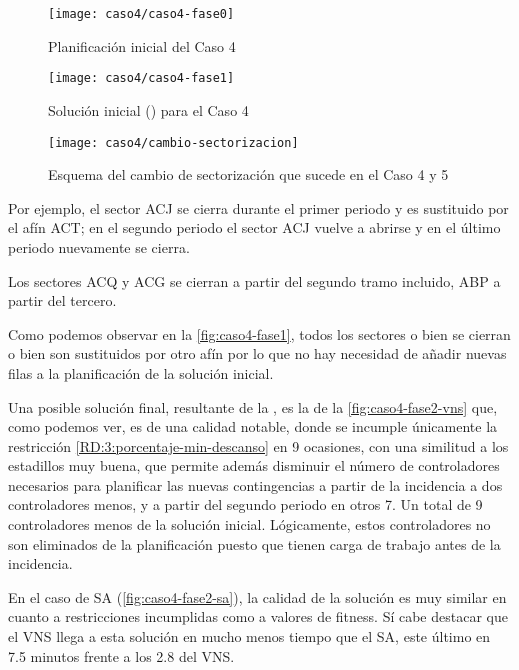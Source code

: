 \begin{figure}[!]
	\centering
	\texttt{[image: caso4/caso4-fase0]}
	\caption{Planificación inicial del Caso 4}
	\label{fig:caso4-fase0}
\end{figure}

\begin{figure}[!]
	\centering
	\texttt{[image: caso4/caso4-fase1]}
	\caption{Solución inicial (\faseuno{}) para el Caso 4}
	\label{fig:caso4-fase1}
\end{figure}

\begin{figure}[!]
	\centering
	\texttt{[image: caso4/cambio-sectorizacion]}
	\caption{Esquema del cambio de sectorización que sucede en el Caso 4 y 5}
	\label{fig:caso4-cambio-sectorizacion}
\end{figure}

Por ejemplo, el sector ACJ se cierra durante el primer periodo y es sustituido por el afín ACT; en el segundo periodo el sector ACJ vuelve a abrirse y en el último periodo nuevamente se cierra. 

Los sectores ACQ y ACG se cierran a partir del segundo tramo incluido, ABP a partir del tercero.

Como podemos observar en la \autoref{fig:caso4-fase1}, todos los sectores o bien se cierran o bien son sustituidos por otro afín por lo que no hay necesidad de añadir nuevas filas a la planificación de la solución inicial.

Una posible solución final, resultante de la \fasedos{}, es la de la \autoref{fig:caso4-fase2-vns} que, como podemos ver, es de una calidad notable, donde se incumple únicamente la restricción \ref{RD:3:porcentaje-min-descanso} en 9 ocasiones, con una similitud a los estadillos muy buena, que permite además disminuir el número de controladores necesarios para planificar las nuevas contingencias a partir de la incidencia a dos controladores menos, y a partir del segundo periodo en otros 7. Un total de 9 controladores menos de la solución inicial. Lógicamente, estos controladores no son eliminados de la planificación puesto que tienen carga de trabajo antes de la incidencia.

En el caso de SA (\autoref{fig:caso4-fase2-sa}), la calidad de la solución es muy similar en cuanto a restricciones incumplidas como a valores de fitness. Sí cabe destacar que el VNS llega a esta solución en mucho menos tiempo que el SA, este último en 7.5 minutos frente a los 2.8 del VNS.

